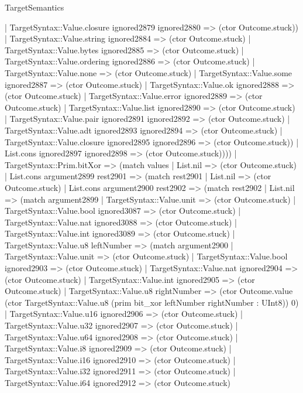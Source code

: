 \begin{lexlean}{TargetSemantics}
\begin{semanticmodule}
{              | TargetSyntax::Value.closure ignored2879 ignored2880 => (ctor Outcome.stuck))
            | TargetSyntax::Value.string ignored2884 => (ctor Outcome.stuck)
            | TargetSyntax::Value.bytes ignored2885 => (ctor Outcome.stuck)
            | TargetSyntax::Value.ordering ignored2886 => (ctor Outcome.stuck)
            | TargetSyntax::Value.none => (ctor Outcome.stuck)
            | TargetSyntax::Value.some ignored2887 => (ctor Outcome.stuck)
            | TargetSyntax::Value.ok ignored2888 => (ctor Outcome.stuck)
            | TargetSyntax::Value.error ignored2889 => (ctor Outcome.stuck)
            | TargetSyntax::Value.list ignored2890 => (ctor Outcome.stuck)
            | TargetSyntax::Value.pair ignored2891 ignored2892 => (ctor Outcome.stuck)
            | TargetSyntax::Value.adt ignored2893 ignored2894 => (ctor Outcome.stuck)
            | TargetSyntax::Value.closure ignored2895 ignored2896 => (ctor Outcome.stuck))
          | List.cons ignored2897 ignored2898 => (ctor Outcome.stuck))))
    | TargetSyntax::Prim.bitXor => (match values
      | List.nil => (ctor Outcome.stuck)
      | List.cons argument2899 rest2901 => (match rest2901
        | List.nil => (ctor Outcome.stuck)
        | List.cons argument2900 rest2902 => (match rest2902
          | List.nil => (match argument2899
            | TargetSyntax::Value.unit => (ctor Outcome.stuck)
            | TargetSyntax::Value.bool ignored3087 => (ctor Outcome.stuck)
            | TargetSyntax::Value.nat ignored3088 => (ctor Outcome.stuck)
            | TargetSyntax::Value.int ignored3089 => (ctor Outcome.stuck)
            | TargetSyntax::Value.u8 leftNumber => (match argument2900
              | TargetSyntax::Value.unit => (ctor Outcome.stuck)
              | TargetSyntax::Value.bool ignored2903 => (ctor Outcome.stuck)
              | TargetSyntax::Value.nat ignored2904 => (ctor Outcome.stuck)
              | TargetSyntax::Value.int ignored2905 => (ctor Outcome.stuck)
              | TargetSyntax::Value.u8 rightNumber => (ctor Outcome.value (ctor TargetSyntax::Value.u8 (prim bit_xor leftNumber rightNumber : UInt8)) 0)
              | TargetSyntax::Value.u16 ignored2906 => (ctor Outcome.stuck)
              | TargetSyntax::Value.u32 ignored2907 => (ctor Outcome.stuck)
              | TargetSyntax::Value.u64 ignored2908 => (ctor Outcome.stuck)
              | TargetSyntax::Value.i8 ignored2909 => (ctor Outcome.stuck)
              | TargetSyntax::Value.i16 ignored2910 => (ctor Outcome.stuck)
              | TargetSyntax::Value.i32 ignored2911 => (ctor Outcome.stuck)
              | TargetSyntax::Value.i64 ignored2912 => (ctor Outcome.stuck)
}
\end{semanticmodule}
\end{lexlean}
